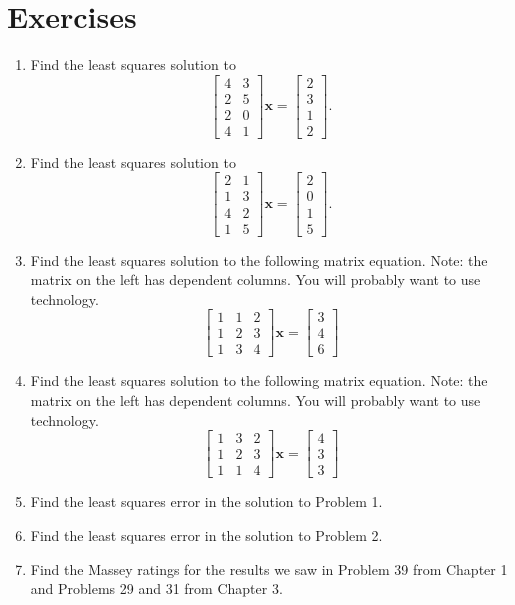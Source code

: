 \documentclass[
]{book}
\theoremstyle{definition}
\theoremstyle{definition}
\theoremstyle{definition}
\theoremstyle{definition}
\theoremstyle{remark}
\begin{document}
\section{Exercises}\label{exercises-4}

\begin{enumerate}
\def\labelenumi{\arabic{enumi}.}
\item
  Find the least squares solution to
  \[\begin{bmatrix} 4 & 3\\2 & 5\\2 & 0\\4 & 1\end{bmatrix}\mathbf{x}=\begin{bmatrix}2\\3\\1\\2\end{bmatrix}.\]
\item
  Find the least squares solution to
  \[\begin{bmatrix} 2 & 1\\1 & 3\\4 & 2\\1 & 5\end{bmatrix}\mathbf{x}=\begin{bmatrix}2\\0\\1\\5\end{bmatrix}.\]
\item
  Find the least squares solution to the following matrix equation. Note: the matrix on the left has dependent columns. You will probably want to use technology.
  \[\begin{bmatrix} 1 & 1 & 2\\1 & 2 & 3\\1 & 3 & 4\end{bmatrix}\mathbf{x}=\begin{bmatrix}3\\4\\6\end{bmatrix}\]
\item
  Find the least squares solution to the following matrix equation. Note: the matrix on the left has dependent columns. You will probably want to use technology.
  \[\begin{bmatrix} 1 & 3 & 2\\1 & 2 & 3\\1 & 1 & 4\end{bmatrix}\mathbf{x}=\begin{bmatrix}4\\3\\3\end{bmatrix}\]
\item
  Find the least squares error in the solution to Problem 1.
\item
  Find the least squares error in the solution to Problem 2.
\item
  Find the Massey ratings for the results we saw in Problem 39 from Chapter 1 and Problems 29 and 31 from Chapter 3.
\end{enumerate}
\end{document}
